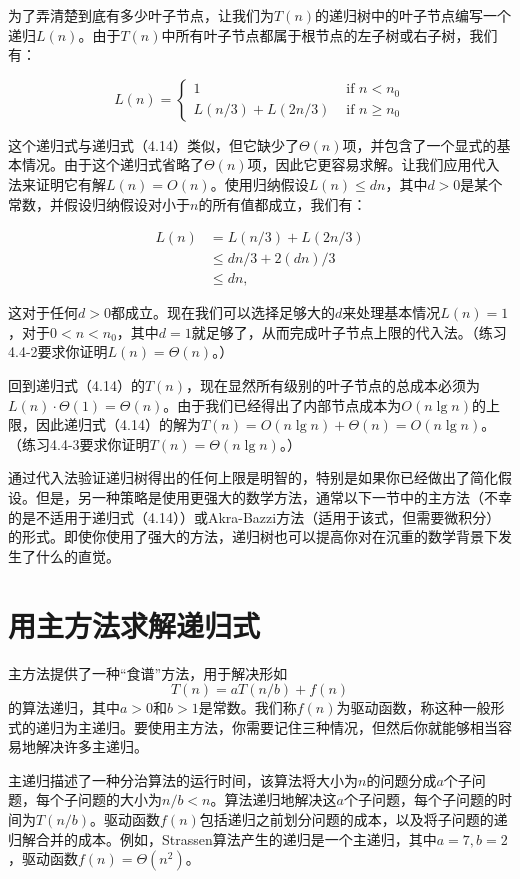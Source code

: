 \documentclass[lang=cn,newtx,10pt,scheme=chinese]{elegantbook}
\begin{document}
为了弄清楚到底有多少叶子节点，让我们为$T(n)$的递归树中的叶子节点编写一个递归$L(n)$。由于$T(n)$中所有叶子节点都属于根节点的左子树或右子树，我们有：

\begin{equation}
L(n)= \begin{cases}1 & \text { if } n<n_0 \\ L(n / 3)+L(2 n / 3) & \text { if } n \geq n_0\end{cases}
\end{equation}

这个递归式与递归式（4.14）类似，但它缺少了$\Theta(n)$项，并包含了一个显式的基本情况。由于这个递归式省略了$\Theta(n)$项，因此它更容易求解。让我们应用代入法来证明它有解$L(n)=O(n)$。使用归纳假设$L(n) \leq d n$，其中$d>0$是某个常数，并假设归纳假设对小于$n$的所有值都成立，我们有：

$$
\begin{aligned}
L(n) & =L(n / 3)+L(2 n / 3) \\
& \leq d n / 3+2(d n) / 3 \\
& \leq d n,
\end{aligned}
$$

这对于任何$d>0$都成立。现在我们可以选择足够大的$d$来处理基本情况$L(n)=1$，对于$0<n<n_0$，其中$d=1$就足够了，从而完成叶子节点上限的代入法。（练习4.4-2要求你证明$L(n)=\Theta(n)$。）

回到递归式（4.14）的$T(n)$，现在显然所有级别的叶子节点的总成本必须为$L(n) \cdot \Theta(1)=\Theta(n)$。由于我们已经得出了内部节点成本为$O(n \lg n)$的上限，因此递归式（4.14）的解为$T(n)=O(n \lg n)+\Theta(n)=O(n \lg n)$。（练习4.4-3要求你证明$T(n)=\Theta(n \lg n)$。）

通过代入法验证递归树得出的任何上限是明智的，特别是如果你已经做出了简化假设。但是，另一种策略是使用更强大的数学方法，通常以下一节中的主方法（不幸的是不适用于递归式（4.14））或Akra-Bazzi方法（适用于该式，但需要微积分）的形式。即使你使用了强大的方法，递归树也可以提高你对在沉重的数学背景下发生了什么的直觉。

\section{用主方法求解递归式}

主方法提供了一种“食谱”方法，用于解决形如
$$
T(n)=a T(n / b)+f(n)
$$
的算法递归，其中$a>0$和$b>1$是常数。我们称$f(n)$为驱动函数，称这种一般形式的递归为主递归。要使用主方法，你需要记住三种情况，但然后你就能够相当容易地解决许多主递归。

主递归描述了一种分治算法的运行时间，该算法将大小为$n$的问题分成$a$个子问题，每个子问题的大小为$n / b<n$。算法递归地解决这$a$个子问题，每个子问题的时间为$T(n / b)$。驱动函数$f(n)$包括递归之前划分问题的成本，以及将子问题的递归解合并的成本。例如，Strassen算法产生的递归是一个主递归，其中$a=7, b=2$，驱动函数$f(n)=\Theta\left(n^2\right)$。
\end{document}
